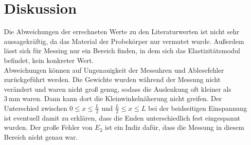 \section{Diskussion}
\label{sec:Diskussion}
Die Abweichungen der errechneten Werte zu den Literaturwerten ist nicht sehr aussagekräftig, da das Material der Probekörper nur vermutet wurde.
Außerdem lässt sich für Messing nur ein Bereich finden, in dem sich das Elastizitätsmodul befindet, kein konkreter Wert.\\
Abweichungen können auf Ungenauigkeit der Messuhren und Ablesefehler zurückgeführt werden.
Die Gewichte wurden während der Messung nicht verändert und waren nicht groß genug, sodass die Auslenkung oft kleiner als $\SI{3}{\milli\metre}$ waren.
Dann kann dort die Kleinwinkelnäherung nicht greifen.
Der Unterschied zwischen $0 \leq x \leq \frac{L}{2}$ und $\frac{L}{2}\leq x\leq L$ bei der beidseitigen Einspannung ist eventuell damit zu erklären, 
dass die Enden unterschiedlich fest eingespannt wurden. 
Der große Fehler von $E_2$ ist ein Indiz dafür, dass die Messung in diesem Bereich nicht genau war.

